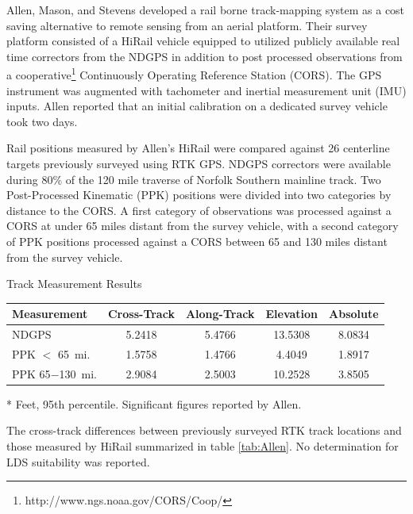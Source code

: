 Allen, Mason, and Stevens developed a rail borne track-mapping system as a cost saving alternative to remote sensing from an aerial platform. Their survey platform consisted of a HiRail vehicle equipped to utilized publicly available real time correctors from the NDGPS in addition to post processed observations from a cooperative\footnote{http://www.ngs.noaa.gov/CORS/Coop/} Continuously Operating Reference Station (CORS). The GPS instrument was augmented with tachometer and inertial measurement unit (IMU) inputs. Allen reported that an initial calibration on a dedicated survey vehicle took two days.

Rail positions measured by Allen's HiRail were compared against 26 centerline targets previously surveyed using RTK GPS. NDGPS correctors were available during 80\% of the 120 mile traverse of Norfolk Southern mainline track. Two Post-Processed Kinematic (PPK) positions were divided into two categories by distance to the CORS. A first category of observations was processed against a CORS at under 65 miles distant from the survey vehicle, with a second category of PPK positions processed against a CORS between 65 and 130 miles distant from the survey vehicle.

\begin{center}
\begin{threeparttable}
	\caption{Track Measurement Results~\citep{2006AllenAssetMap}}\label{tab:Allen}
		\begin{tabular}{ lcccc }
		\toprule
		Measurement &  Cross-Track\tnote{*} & Along-Track\tnote{*} & Elevation\tnote{*} & Absolute\tnote{*}\\
		\midrule
		NDGPS & 5.2418 & 5.4766 &13.5308 & 8.0834\\
		PPK $<$ 65~mi. & 1.5758 & 1.4766 &4.4049 & 1.8917\\
		PPK 65$-$130~mi.  & 2.9084 & 2.5003 &10.2528 & 3.8505\\
		\bottomrule
		\end{tabular}
		\begin{tablenotes}
		\item[*]{Feet, 95th percentile. Significant figures reported by Allen.}
		\end{tablenotes}
\end{threeparttable}
\end{center}

The cross-track differences between previously surveyed RTK track locations and those measured by HiRail summarized in table \ref{tab:Allen}. No determination for LDS suitability was reported.

